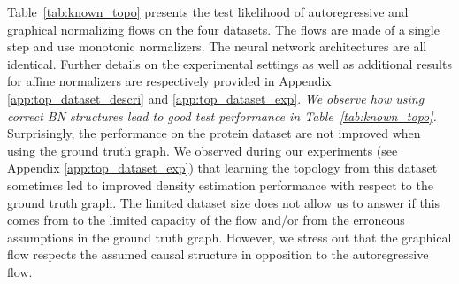 \documentclass[twoside]{article}
\newcommand{\Cref}[1]{Table~\ref{#1}}
\begin{document}
\Cref{tab:known_topo} presents the test likelihood of autoregressive and graphical normalizing flows on the four datasets. The flows are made of a single step and use monotonic normalizers. The neural network architectures are all identical. Further details on the experimental settings as well as additional results for affine normalizers are respectively provided in Appendix \ref{app:top_dataset_descri} and \ref{app:top_dataset_exp}. \emph{We observe how using correct BN structures lead to good test performance in \Cref{tab:known_topo}.} %
Surprisingly, the performance on the protein dataset are not improved when using the ground truth graph. We observed during our experiments (see Appendix \ref{app:top_dataset_exp}) that learning the topology from this dataset sometimes led to improved density estimation performance with respect to the ground truth graph. The limited dataset size does not allow us to answer if this comes from to the limited capacity of the flow and/or from the erroneous assumptions in the ground truth graph. However, we stress out that the graphical flow respects the assumed causal structure in opposition to the autoregressive flow.

\end{document}
